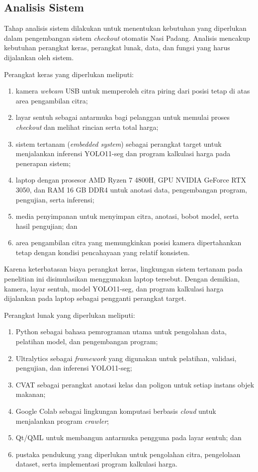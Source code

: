 \subsection{Analisis Sistem}

Tahap analisis sistem dilakukan untuk menentukan kebutuhan yang diperlukan dalam pengembangan sistem \textit{checkout} otomatis Nasi Padang. Analisis mencakup kebutuhan perangkat keras, perangkat lunak, data, dan fungsi yang harus dijalankan oleh sistem.

Perangkat keras yang diperlukan meliputi:
\begin{enumerate}
    \item kamera \textit{webcam} USB untuk memperoleh citra piring dari posisi tetap di atas area pengambilan citra;
    \item layar sentuh sebagai antarmuka bagi pelanggan untuk memulai proses \textit{checkout} dan melihat rincian serta total harga;
    \item sistem tertanam (\textit{embedded system}) sebagai perangkat target untuk menjalankan inferensi YOLO11-seg dan program kalkulasi harga pada penerapan sistem;
    \item laptop dengan prosesor AMD Ryzen 7 4800H, GPU NVIDIA GeForce RTX 3050, dan RAM 16 GB DDR4 untuk anotasi data, pengembangan program, pengujian, serta inferensi;
    \item media penyimpanan untuk menyimpan citra, anotasi, bobot model, serta hasil pengujian; dan
    \item area pengambilan citra yang memungkinkan posisi kamera dipertahankan tetap dengan kondisi pencahayaan yang relatif konsisten.
\end{enumerate}

Karena keterbatasan biaya perangkat keras, lingkungan sistem tertanam pada penelitian ini disimulasikan menggunakan laptop tersebut. Dengan demikian, kamera, layar sentuh, model YOLO11-seg, dan program kalkulasi harga dijalankan pada laptop sebagai pengganti perangkat target.

Perangkat lunak yang diperlukan meliputi:
\begin{enumerate}
    \item Python sebagai bahasa pemrograman utama untuk pengolahan data, pelatihan model, dan pengembangan program;
    \item Ultralytics sebagai \textit{framework} yang digunakan untuk pelatihan, validasi, pengujian, dan inferensi YOLO11-seg;
    \item CVAT sebagai perangkat anotasi kelas dan poligon untuk setiap instans objek makanan;
    \item Google Colab sebagai lingkungan komputasi berbasis \textit{cloud} untuk menjalankan program \textit{crawler};
    \item Qt/QML untuk membangun antarmuka pengguna pada layar sentuh; dan
    \item pustaka pendukung yang diperlukan untuk pengolahan citra, pengelolaan dataset, serta implementasi program kalkulasi harga.
\end{enumerate}


